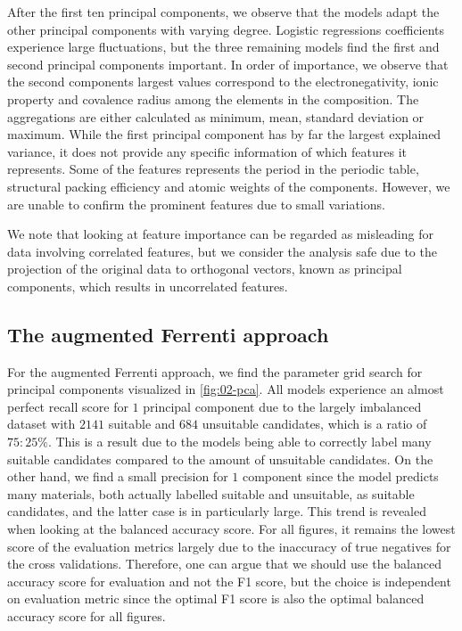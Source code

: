 After the first ten principal components, we observe that the models adapt the other principal components with varying degree. Logistic regressions coefficients experience large fluctuations, but the three remaining models find the first and second principal components important. In order of importance, we observe that the second components largest values correspond to the electronegativity, ionic property and covalence radius among the elements in the composition. The aggregations are either calculated as minimum, mean, standard deviation or maximum. While the first principal component has by far the largest explained variance, it does not provide any specific information of which features it represents. Some of the features represents the period in the periodic table, structural packing efficiency and atomic weights of the components. However, we are unable to confirm the prominent features due to small variations.


We note that looking at feature importance can be regarded as misleading for data involving correlated features, but we consider the analysis safe due to the projection of the original data to orthogonal vectors, known as principal components, which results in uncorrelated features.



\subsection{The augmented Ferrenti approach}

For the augmented Ferrenti approach, we find the parameter grid search for principal components visualized in \autoref{fig:02-pca}. All models experience an almost perfect recall score for $1$ principal component due to the largely imbalanced dataset with $2141$ suitable and $684$ unsuitable candidates, which is a ratio of $75:25 \%$. This is a result due to the models being able to correctly label many suitable candidates compared to the amount of unsuitable candidates. On the other hand, we find a small precision for $1$ component since the model predicts many materials, both actually labelled suitable and unsuitable, as suitable candidates, and the latter case is in particularly large. This trend is revealed when looking at the balanced accuracy score. For all figures, it remains the lowest score of the evaluation metrics largely due to the inaccuracy of true negatives for the cross validations. Therefore, one can argue that we should use the balanced accuracy score for evaluation and not the F1 score, but the choice is independent on evaluation metric since the optimal F1 score is also the optimal balanced accuracy score for all figures.


